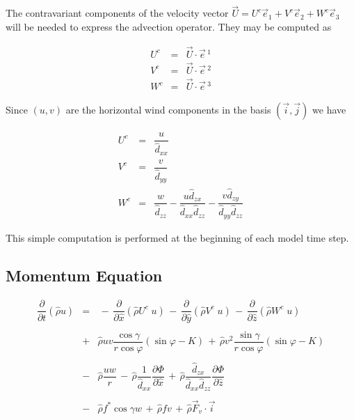 The contravariant components of the velocity vector
 $\vec{U} = U^{c} \vec{e} _{1}+ V^{c} \vec{e} _{2}
 + W^{c} \vec{e} _{3} $ will be needed to express the advection operator.
They may be computed as

\begin{eqnarray}
U^{c} & = &  \vec{U} \cdot \vec{e}\, ^{1} \\
V^{c} & = &  \vec{U} \cdot \vec{e}\, ^{2} \\
W^{c} & = &\vec{U} \cdot \vec{e}\, ^{3}
\end{eqnarray}

Since $( u , v )$ are the horizontal wind components in the
basis  $( \vec{i}, \vec{j} )$ we have

\begin{eqnarray}
U^{c}&  =& \dfrac{ u }{\widehat{d}_{xx}} \\
V^{c}&  =& \dfrac{ v }{\widehat{d}_{yy}} \\
W^{c}&  =& \dfrac{ w}{\widehat{d}_{zz}}- \dfrac{ u \widehat{d}_{zx}}{\widehat{d}_{xx}\widehat{d}_{zz}}-
\dfrac{ v \widehat{d}_{zy}}{\widehat{d}_{yy}\widehat{d}_{zz}}
\end{eqnarray}

This simple computation is performed at the beginning of each model time
step.

\subsection{Momentum Equation}

\begin{eqnarray}
\dfrac{\partial}{\partial t}(\widehat{\rho}  u ) &= &
 \, - \, \dfrac{\partial }{\partial \widehat{x}} (\widehat{\rho} U^{c } \;   u )
 \, - \, \dfrac{\partial }{\partial \widehat{y}} (\widehat{\rho} V^{c } \;    u )
 \, - \, \dfrac{\partial }{\partial \widehat{z}} (\widehat{\rho} W^{c }  \;    u )
\nonumber \\
& & \nonumber \\
&  + &\widehat{\rho}  u   v  \dfrac{ \cos\gamma}{r\cos\varphi} (\sin\varphi -K)
\,+ \,\widehat{\rho}  v ^{2} \dfrac{ \sin\gamma  }{r\cos\varphi} (\sin\varphi -K)
\nonumber \\
& & \nonumber \\
 & - & \widehat{\rho}\dfrac{ u  w}{r} \,  - \, \widehat{\rho}\dfrac{1}{\widehat{d}_{xx}} \dfrac{\partial \Phi}{\partial \widehat{x}}
\, + \,\widehat{\rho}\dfrac{\widehat{d}_{zx}}{\widehat{d}_{xx}\widehat{d}_{zz}} \dfrac{\partial \Phi}{\partial \widehat{z}} \nonumber \\
& & \nonumber \\
&  - & \widehat{\rho} f^{*} \cos\gamma w \, +  \, \widehat{\rho} f  v
\,+ \, \widehat{\rho} \vec{F}_{v} \cdot \vec{i}
\end{eqnarray}

